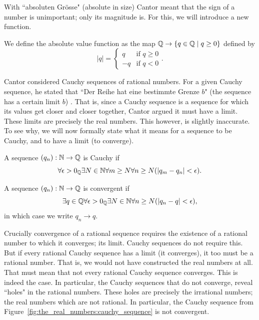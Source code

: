 \documentclass[../main.tex]{subfiles}
\begin{document}
With ``\textgerman{absoluten Grösse}" (absolute in size) Cantor meant that the sign of a number is unimportant; only its magnitude is. For this, we will introduce a new function.
\begin{definition}\label{dfn:the_real_numbers:absolute_value_function}
    We define the absolute value function as the map $\mathbb{Q}\to\{q\in\mathbb{Q}\mid q\geq0\}$ defined by
    \begin{equation*}
        \vert q\vert=
        \begin{cases}
            q & \text{if }q\geq0 \\
            -q & \text{if }q<0
        \end{cases}.
    \end{equation*}
\end{definition}
Cantor considered Cauchy sequences of rational numbers. For a given Cauchy sequence, he stated that ``\textgerman{Der Reihe hat eine bestimmte Grenze $b$}" (the sequence has a certain limit $b$) \cite{Cantor1872}. That is, since a Cauchy sequence is a sequence for which its values get closer and closer together, Cantor argued it must have a limit. These limits are precisely the real numbers. This however, is slightly inaccurate. To see why, we will now formally state what it means for a sequence to be Cauchy, and to have a limit (to converge).
\begin{definition}
    A sequence $(q_n):\mathbb{N}\to\mathbb{Q}$ is Cauchy if
    \begin{equation*}
        \forall\epsilon>0_{\mathbb{Q}}\exists N\in\mathbb{N}\forall m\geq N\forall n\geq N(\vert q_m-q_n\vert<\epsilon).
    \end{equation*}
\end{definition}
\begin{definition}
    A sequence $(q_n):\mathbb{N}\to\mathbb{Q}$ is convergent if
    \begin{equation*}
        \exists q\in\mathbb{Q}\forall\epsilon>0_{\mathbb{Q}}\exists N\in\mathbb{N}\forall n\geq N(\vert q_n-q\vert<\epsilon),
    \end{equation*}
    in which case we write $q_n\to q$.
\end{definition}
Crucially convergence of a rational sequence requires the existence of a rational number to which it converges; its limit. Cauchy sequences do not require this. But if every rational Cauchy sequence has a limit (it converges), it too must be a rational number. That is, we would not have constructed the real numbers at all. That must mean that not every rational Cauchy sequence converges. This is indeed the case. In particular, the Cauchy sequences that do not converge, reveal ``holes" in the rational numbers. These holes are precisely the irrational numbers; the real numbers which are not rational. In particular, the Cauchy sequence from Figure~\ref{fig:the_real_numbers:cauchy_sequence} is not convergent.
\end{document}
